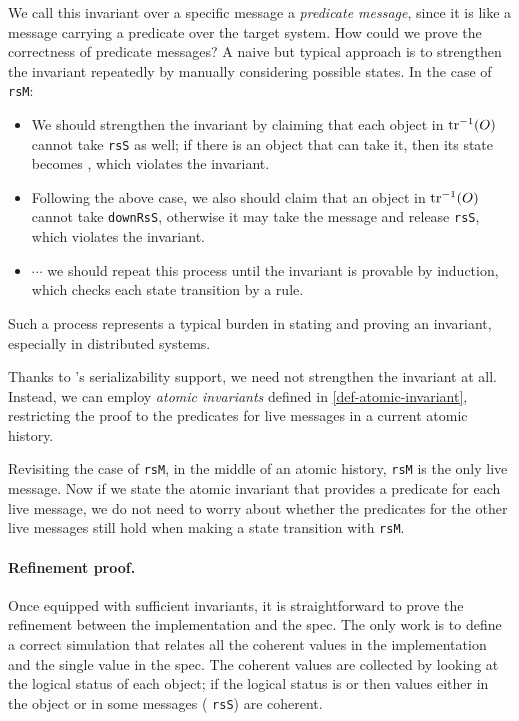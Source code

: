 \documentclass[sigplan,10pt,review,anonymous,screen]{acmart}\settopmatter{printfolios=true,printccs=false,printacmref=false}
\def\slstinline{\lstinline[basicstyle=\ttfamily\small]}
\begin{document}
We call this invariant over a specific message a \emph{predicate message}, since it is like a message carrying a predicate over the target system.
How could we prove the correctness of predicate messages?
A naive but typical approach is to strengthen the invariant repeatedly by manually considering possible states.
In the case of \slstinline{rsM}:
\begin{itemize}
\item We should strengthen the invariant by claiming that each object in $\textrm{tr}^{-1}(O)$ cannot take \slstinline{rsS} as well; if there is an object that can take it, then its state becomes \stS{}, which violates the invariant.
\item Following the above case, we also should claim that an object in $\textrm{tr}^{-1}(O)$ cannot take \slstinline{downRsS}, otherwise it may take the message and release \slstinline{rsS}, which violates the invariant.
\item $\cdots$ we should repeat this process until the invariant is provable by induction, which checks each state transition by a rule.
\end{itemize}
Such a process represents a typical burden in stating and proving an invariant, especially in distributed systems.

Thanks to \hemiola{}'s serializability support, we need not strengthen the invariant at all.
Instead, we can employ \emph{atomic invariants} defined in \autoref{def-atomic-invariant}, restricting the proof to the predicates for live messages in a current atomic history.

Revisiting the case of \slstinline{rsM}, in the middle of an atomic history, \slstinline{rsM} is the only live message.
Now if we state the atomic invariant that provides a predicate for each live message, we do not need to worry about whether the predicates for the other live messages still hold when making a state transition with \slstinline{rsM}.

\paragraph{Refinement proof.}

\newcommand{\implcoh}[3]{\ensuremath{\textit{Coh}\,(#1, #2, #3)}}
\newcommand{\speccoh}[1]{\ensuremath{\textit{Spec}\,(v)}}

Once equipped with sufficient invariants, it is straightforward to prove the refinement between the implementation and the spec.
The only work is to define a correct simulation that relates all the coherent values in the implementation and the single value in the spec.
The coherent values are collected by looking at the logical status of each object; if the logical status is \stS{} or \stM{} then values either in the object or in some messages (\eg{} \slstinline{rsS}) are coherent.
\end{document}
